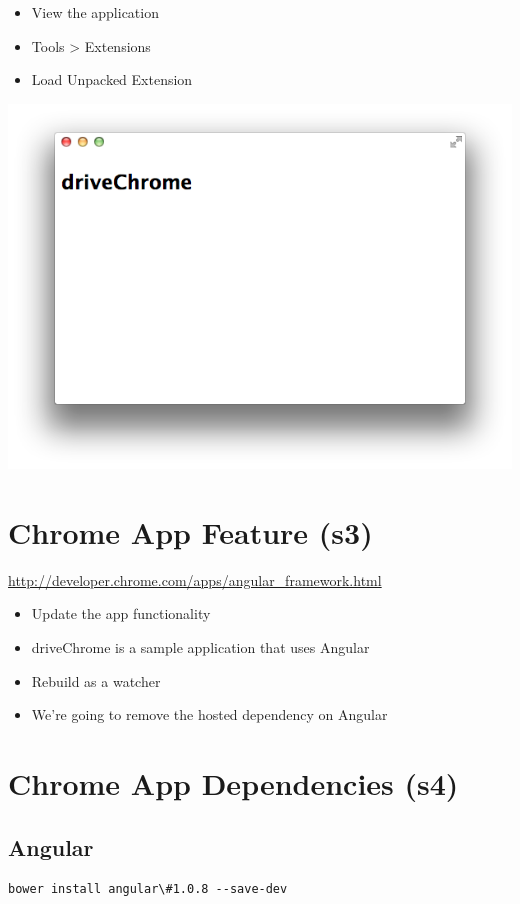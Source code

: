 \documentclass[11pt]{article}
\begin{document}
\begin{itemize}
\item View the application
\item Tools > Extensions
\item Load Unpacked Extension
\end{itemize}

\includegraphics[width=.9\linewidth]{gdg_2013-11-18_yo_grunt_bower/driveChrome.png}
\section*{Chrome App Feature (s3)}
\label{sec-7}

\url{http://developer.chrome.com/apps/angular_framework.html}


\begin{itemize}
\item Update the app functionality
\item driveChrome is a sample application that uses Angular
\item Rebuild as a watcher
\item We're going to remove the hosted dependency on Angular
\end{itemize}
\section*{Chrome App Dependencies (s4)}
\label{sec-8}

\subsection*{Angular}
\label{sec-8-1}

\begin{verbatim}
bower install angular\#1.0.8 --save-dev
\end{verbatim}
\end{document}
